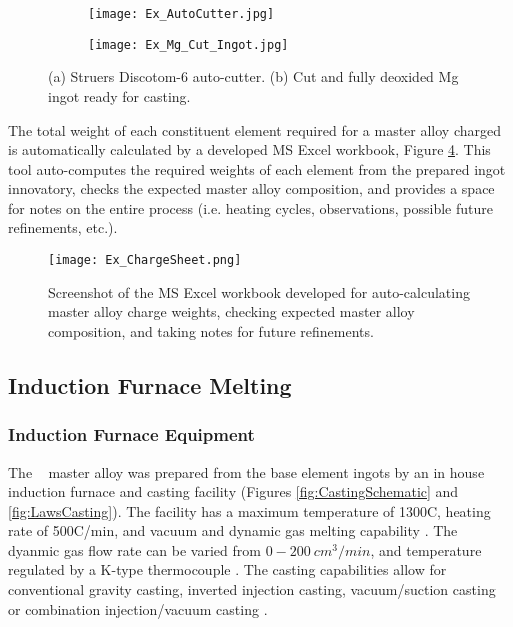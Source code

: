\documentclass[a4paper,12pt,oneside]{report}%
\begin{document}
\begin{figure}[htbp]
	\centering
	\begin{subfigure}[htbp]{0.49\textwidth}
		\texttt{[image: Ex\_AutoCutter.jpg]}
		\caption{}
		\label{fig:AutoCutter}
	\end{subfigure}
	\begin{subfigure}[htbp]{0.30\textwidth}
		\texttt{[image: Ex\_Mg\_Cut\_Ingot.jpg]}
		\caption{}
		\label{fig:MgIngot}
	\end{subfigure}
	\caption{(a) Struers Discotom-6 auto-cutter. (b) Cut and fully deoxided Mg ingot ready for casting.}%
	\label{fig:Cutter_MgIngot}
\end{figure}

The total weight of each constituent element required for a master alloy charged is automatically calculated by a developed MS Excel workbook, Figure \ref{fig:ChargeSheet}. This tool auto-computes the required weights of each element from the prepared ingot innovatory, checks the expected master alloy composition, and provides a space for notes on the entire process (i.e. heating cycles, observations, possible future refinements, etc.).

\begin{figure}[htbp]
	\centering
	\texttt{[image: Ex\_ChargeSheet.png]}
	\caption{Screenshot of the MS Excel workbook developed for auto-calculating master alloy charge weights, checking expected master alloy composition, and taking notes for future refinements.}
	\label{fig:ChargeSheet}
\end{figure}

\subsection{Induction Furnace Melting}
\subsubsection{Induction Furnace Equipment}
The \MgZnCa~ master alloy was prepared from the base element ingots by an in house induction furnace and casting facility (Figures \ref{fig:CastingSchematic} and \ref{fig:LawsCasting}). The facility has a maximum temperature of 1300\degree C, heating rate of 500\degree C/min, and vacuum and dynamic gas melting capability \cite{Laws2007}. The dyanmic gas flow rate can be varied from $0-200~ cm^{3}/min$, and temperature regulated by a K-type thermocouple \cite{Laws2007}. The casting capabilities allow for conventional gravity casting, inverted injection casting, vacuum/suction casting or combination injection/vacuum casting \cite{Laws2007}.
\end{document}

